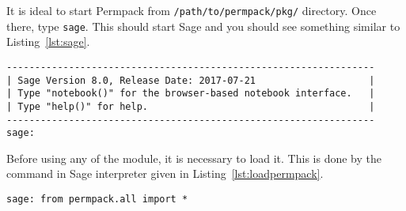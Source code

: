 It is ideal to start Permpack from \texttt{/path/to/permpack/pkg/} directory. Once there, type \texttt{sage}. This should start Sage and you should see something similar to Listing~\ref{lst:sage}.
 {}
\begin{lstlisting}
-----------------------------------------------------------------
| Sage Version 8.0, Release Date: 2017-07-21                    |
| Type "notebook()" for the browser-based notebook interface.   |
| Type "help()" for help.                                       |
-----------------------------------------------------------------
sage:
\end{lstlisting}

Before using any of the module, it is necessary to load it. This is done by the command in Sage interpreter given in Listing~\ref{lst:loadpermpack}.
 {}
\begin{lstlisting}
sage: from permpack.all import *
\end{lstlisting}

